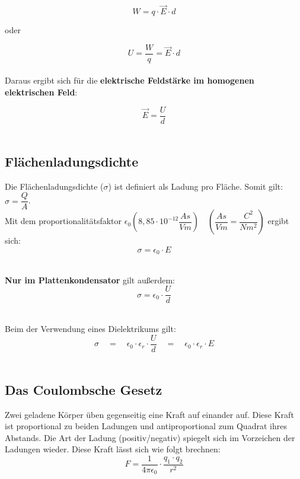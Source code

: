 \documentclass[a4paper]{article}
\begin{document}
\Large$$W = q \cdot \vec{E} \cdot d$$\normalsize

\begin{center}
	\vspace{0,4cm}oder
\end{center}

\Large$$U = \dfrac{W}{q} = \vec{E} \cdot d$$\normalsize\\

Daraus ergibt sich für die \textbf{elektrische Feldstärke im homogenen elektrischen Feld}:

\Large$$\vec{E} = \dfrac{U}{d}$$\normalsize\\



\subsection{Flächenladungsdichte}

Die Flächenladungsdichte ($\sigma$) ist definiert als Ladung pro Fläche. Somit gilt:$\sigma = \dfrac{Q}{A}$.\\
Mit dem proportionalitätsfaktor $\epsilon_0 (8,85\cdot10^{-12}\dfrac{As}{Vm}) \quad (\dfrac{As}{Vm} = \dfrac{C^2}{Nm^2})$ ergibt sich:\\
\Large$$\sigma = \epsilon_0 \cdot E$$\\ \normalsize

\textbf{Nur im Plattenkondensator} gilt außerdem:\\
\Large$$\sigma = \epsilon_0 \cdot \dfrac{U}{d}$$\\ \normalsize

Beim der Verwendung eines Dielektrikums gilt:\\
\Large$$\sigma \quad=\quad \epsilon_0 \cdot \epsilon_r \cdot \dfrac{U}{d} \quad=\quad \epsilon_0 \cdot \epsilon_r \cdot E$$\\ \normalsize


\subsection{Das Coulombsche Gesetz}

Zwei geladene Körper üben gegenseitig eine Kraft auf einander auf. Diese Kraft ist proportional zu beiden Ladungen
und antiproportional zum Quadrat ihres Abstands. Die Art der Ladung (positiv/negativ) spiegelt sich im Vorzeichen
der Ladungen wieder. Diese Kraft lässt sich wie folgt brechnen:\\

\Large$$F = \dfrac{1}{4\pi \epsilon_0} \cdot \dfrac{q_1 \cdot q_2}{r^2}$$\\ \normalsize
\end{document}
